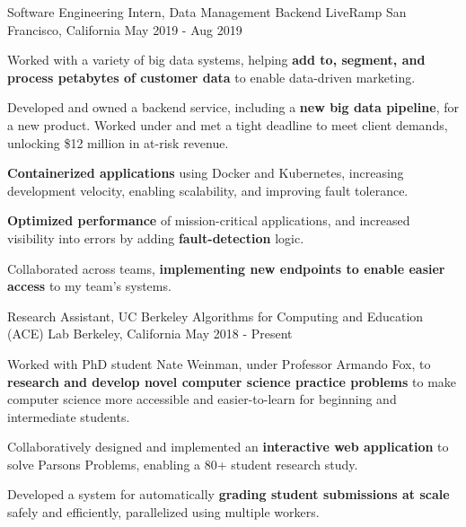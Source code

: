 

\begin{cventries}

    \cventry
      {Software Engineering Intern, Data Management Backend}
      {LiveRamp}
      {San Francisco, California}
      {May 2019 - Aug 2019}
      {
        \begin{cvitems}
          \item Worked with a variety of big data systems, helping \textbf{add to, segment, and process petabytes of customer data} to enable data-driven marketing.
          \item Developed and owned a backend service, including a \textbf{new big data pipeline}, for a new product. Worked under and met a tight deadline to meet client demands, unlocking \$12 million in at-risk revenue.
          \item \textbf{Containerized applications} using Docker and Kubernetes, increasing development velocity, enabling scalability, and improving fault tolerance.         
          \item \textbf{Optimized performance} of mission-critical applications, and increased visibility into errors by adding \textbf{fault-detection} logic.
          \item Collaborated across teams, \textbf{implementing new endpoints to enable easier access} to my team's systems.
        \end{cvitems}
      }

    \cventry
      {Research Assistant, UC Berkeley}
      {Algorithms for Computing and Education (ACE) Lab}
      {Berkeley, California}
      {May 2018 - Present}
      {
        \begin{cvitems}
          \item Worked with PhD student Nate Weinman, under Professor Armando Fox, to \textbf{research and develop novel computer science practice problems}
          to make computer science more accessible and easier-to-learn for beginning and intermediate students.
          \item Collaboratively designed and implemented an \textbf{interactive web application} to solve Parsons Problems, enabling a 80+ student research study. 
          \item Developed a system for automatically \textbf{grading student submissions at scale} safely and efficiently, parallelized using multiple workers.
        \end{cvitems}  
      }

\end{cventries}
